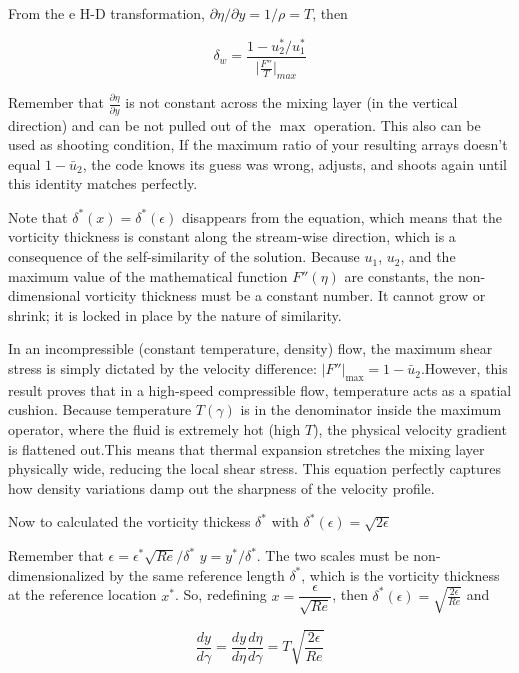From the e H-D transformation, $\partial \eta/\partial y=1/\rho=T$, then

\begin{equation*}
\delta_w
=
 \frac{1-u_2^*/u_1^*}
 {
   \big|
   \frac{F''}{T}
   \big|_{max}
  }
\end{equation*}   

Remember  that $\frac{\partial \eta}{\partial y}$ is not constant across
the mixing layer (in the vertical direction) and can be not pulled out of the $\max$
operation.
This also can be used as shooting condition, 
If the maximum ratio of your resulting arrays doesn't equal $1 - \bar{u}_2$,
the code knows its guess was wrong, adjusts, and shoots again until this
identity matches perfectly.

Note that $\delta^*(x)=\delta^*(\epsilon)$ disappears from the equation, which means that the vorticity
thickness is constant along the stream-wise direction, which is a consequence of
the self-similarity of the solution.
Because $u_1$, $u_2$, and the maximum value of the mathematical function
$F''(\eta)$ are constants, the non-dimensional vorticity thickness must be a
constant number. It cannot grow or shrink; it is locked in place by the nature
of similarity.

In an incompressible (constant temperature, density) flow, the maximum shear stress is
simply dictated by the velocity difference: $|F''|_{\max} = 1 -
\bar{u}_2$.However, this result  proves that in a high-speed compressible flow,
temperature acts as a spatial cushion. Because temperature $T(\gamma)$ is in the
denominator inside the maximum operator, where the fluid is extremely hot (high
$T$), the physical velocity gradient is flattened out.This means that thermal
expansion stretches the mixing layer physically wide, reducing the local shear
stress. This equation  perfectly captures how density variations damp out the
sharpness of the velocity profile.


Now  to calculated the vorticity thickess $\delta^*$
with $\delta^*(\epsilon)=\sqrt{2\epsilon}$

Remember that  $\epsilon=\epsilon^*\sqrt{Re}/\delta^*$ $y=y^*/\delta^*$. 
The two scales must be non-dimensionalized by the same reference length $\delta^*$, which is the vorticity thickness at the reference location $x^*$.
So, redefining $x=\dfrac{\epsilon}{\sqrt{Re}}$, then $\delta^*(\epsilon)=\sqrt{\frac{2\epsilon}{Re}}$ and 

\begin{equation*}
   \frac{dy}{d\gamma}
   =
   \frac{dy}{d\eta}
   \frac{d\eta}{d\gamma}
   =
   T\sqrt{\frac{2\epsilon}{Re}}
\end{equation*}

